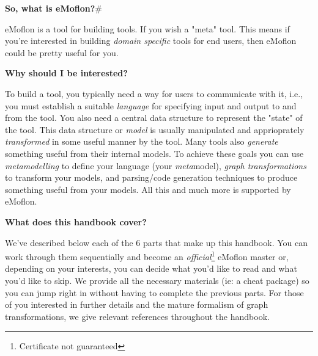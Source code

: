 {\bf \large So, what is eMoflon?}#

eMoflon is a tool for building tools.  If you wish a "meta" tool.  This means if you're interested in building \emph{domain specific} tools for end users, then eMoflon could be pretty useful for you.


{\bf \large Why should I be interested?}

To build a tool, you typically need a way for users to communicate with it, i.e., you must establish a suitable \emph{language} for specifying input and output to and from the tool.  You also need a central data structure to represent the "state" of the tool.  This data structure or \emph{model} is usually manipulated and apprioprately \emph{transformed} in some useful manner by the tool.  Many tools also \emph{generate} something useful from their internal models.  To achieve these goals you can use \emph{metamodelling} to define your language (your \emph{meta}model), \emph{graph transformations} to transform your models, and parsing/code generation techniques to produce something useful from your models. All this and much more is supported by eMoflon.


{\bf \large What does this handbook cover?}

We've described below each of the 6 parts that make up this handbook. You can work through them sequentially and become an \emph{official}\footnote{Certificate not guaranteed} eMoflon master or, depending on your interests, you can decide what you'd like to read and what you'd like to skip. We provide all the necessary materials (ie: a cheat package) so you can jump right in without having to complete the previous parts. For those of you interested in further details and the mature formalism of graph transformations, we give relevant references throughout the handbook.

